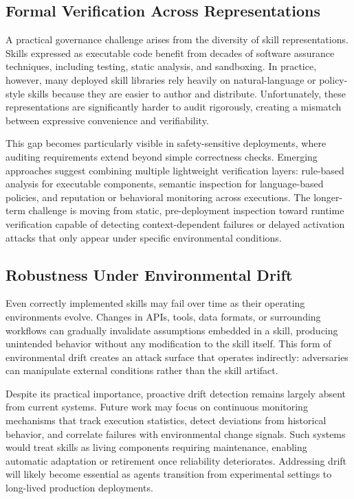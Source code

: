 \documentclass[conference, compsoc]{IEEEtran}
\theoremstyle{plain}
\begin{document}
{\subsection{Formal Verification Across Representations}
\label{sec:open:verification}

A practical governance challenge arises from the diversity of skill representations. Skills expressed as executable code benefit from decades of software assurance techniques, including testing, static analysis, and sandboxing. In practice, however, many deployed skill libraries rely heavily on natural-language or policy-style skills because they are easier to author and distribute. Unfortunately, these representations are significantly harder to audit rigorously, creating a mismatch between expressive convenience and verifiability.

This gap becomes particularly visible in safety-sensitive deployments, where auditing requirements extend beyond simple correctness checks. Emerging approaches suggest combining multiple lightweight verification layers: rule-based analysis for executable components, semantic inspection for language-based policies, and reputation or behavioral monitoring across executions. The longer-term challenge is moving from static, pre-deployment inspection toward runtime verification capable of detecting context-dependent failures or delayed activation attacks that only appear under specific environmental conditions.

\subsection{Robustness Under Environmental Drift}
\label{sec:open:drift}

Even correctly implemented skills may fail over time as their operating environments evolve. Changes in APIs, tools, data formats, or surrounding workflows can gradually invalidate assumptions embedded in a skill, producing unintended behavior without any modification to the skill itself. This form of environmental drift creates an attack surface that operates indirectly: adversaries can manipulate external conditions rather than the skill artifact.

Despite its practical importance, proactive drift detection remains largely absent from current systems. Future work may focus on continuous monitoring mechanisms that track execution statistics, detect deviations from historical behavior, and correlate failures with environmental change signals. Such systems would treat skills as living components requiring maintenance, enabling automatic adaptation or retirement once reliability deteriorates. Addressing drift will likely become essential as agents transition from experimental settings to long-lived production deployments.


}
\end{document}
